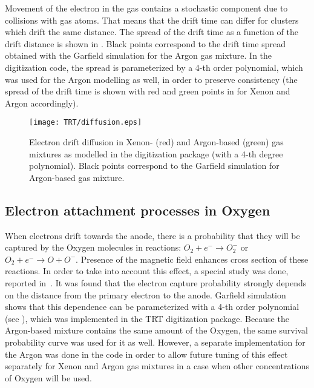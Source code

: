 
Movement of the electron in the gas contains a stochastic component due to collisions with gas atoms. 
That means that the drift time can differ for clusters which drift the same distance.
The spread of the drift time as a function of the drift distance is shown in .
Black points correspond to the drift time spread obtained with the Garfield simulation for the Argon gas mixture.
In the digitization code, the spread is parameterized by a 4-th order polynomial, which was used for the Argon modelling as well,
in order to preserve consistency (the spread of the drift time is shown with red and green points in  for Xenon and Argon accordingly).

\begin{figure}
\begin{center}
\texttt{[image: TRT/diffusion.eps]}
\caption{Electron drift diffusion in Xenon- (red) and Argon-based (green) gas mixtures as modelled in the digitization package (with a 4-th degree polynomial). 
Black points correspond to the Garfield simulation for Argon-based gas mixture.}
\label{fig:diffusion}
\end{center}
\end{figure}


\subsection{Electron attachment processes in Oxygen}
\label{subsec:recapture}
When electrons drift towards the anode, there is a probability that they will be captured by the Oxygen molecules in reactions:
$O_2 + e^- \to O_2^-$ or $O_2 + e^- \to O + O^-$. Presence of the magnetic field enhances cross section of these reactions.
In order to take into account this effect, a special study was done, reported in~\cite{esben_thesis}.
It was found that the electron capture probability strongly depends on the distance from the primary electron to the anode.
Garfield simulation shows that this dependence can be parameterized with a 4-th order polynomial (see ), 
which was implemented in the TRT digitization package. 
Because the Argon-based mixture contains the same amount of the Oxygen, the same survival probability
curve was used for it as well. However, a separate implementation for the Argon was done in the code in order to allow future tuning of this effect separately for Xenon and Argon gas mixtures
in a case when other concentrations of Oxygen will be used.

